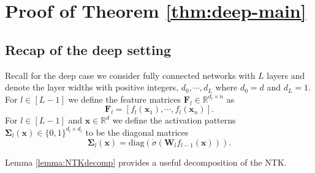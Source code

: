 \documentclass{article}
\theoremstyle{definition}
\newcommand*{\R}{\mathbb{R}}
\def\vx{{\bm{x}}}
\def\mF{{\bm{F}}}
\def\mW{{\bm{W}}}
\def\mSigma{{\bm{\Sigma}}}
\begin{document}
\section{Proof of Theorem \ref{thm:deep-main}}

\subsection{Recap of the deep setting} \label{app:deep-setting}
Recall for the deep case we consider fully connected networks with $L$ layers and denote the layer widths with positive integers, $d_0, \cdots, d_L$ where $d_0 = d$ and $d_L = 1$. For $l \in [L - 1]$ we define the feature matrices $\mF_l \in \R^{d_l \times n}$ as
\[\mF_l = [f_l(\vx_1), \cdots, f_l(\vx_n)]. \]
For $l \in [L - 1]$ and $\vx \in \R^d$ we define the activation patterns $\mSigma_l(\vx) \in \{0, 1\}^{d_l \times d_l}$ to be the diagonal matrices
\[\mSigma_l(\vx) = \text{diag}(\dot{\sigma}(\mW_{l}f_{l - 1}(\vx))). \]

Lemma \ref{lemma:NTKdecomp} provides a useful decomposition of the NTK.
\end{document}
